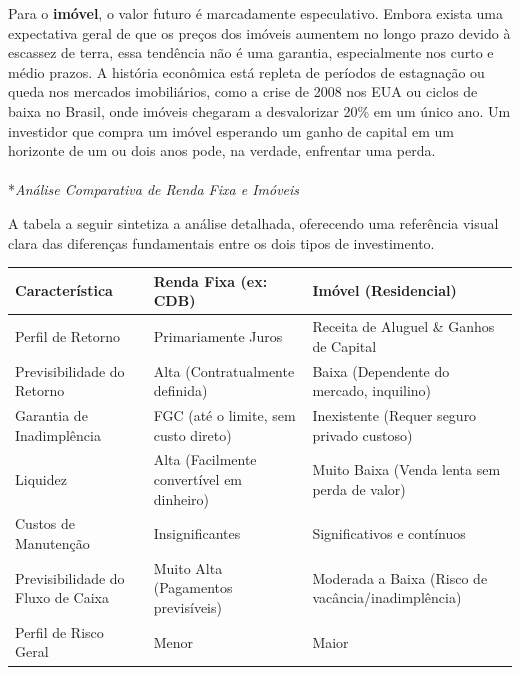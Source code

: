 \documentclass[
  a4paper,
]{book}
\makeatletter
\let\oldparagraph\paragraph
\renewcommand{\paragraph}{
    \@ifstar
      \xxxParagraphStar
      \xxxParagraphNoStar
  }
\newcommand{\xxxParagraphStar}[1]{\oldparagraph*{#1}\mbox{}}
\newcommand{\xxxParagraphNoStar}[1]{\oldparagraph{#1}\mbox{}}
\makeatother
\begin{document}
Para o \textbf{imóvel}, o valor futuro é marcadamente especulativo.
Embora exista uma expectativa geral de que os preços dos imóveis
aumentem no longo prazo devido à escassez de terra, essa tendência não é
uma garantia, especialmente nos curto e médio prazos. A história
econômica está repleta de períodos de estagnação ou queda nos mercados
imobiliários, como a crise de 2008 nos EUA ou ciclos de baixa no Brasil,
onde imóveis chegaram a desvalorizar 20\% em um único ano. Um investidor
que compra um imóvel esperando um ganho de capital em um horizonte de um
ou dois anos pode, na verdade, enfrentar uma perda.

\paragraph*{\texorpdfstring{\emph{Análise Comparativa de Renda Fixa e
Imóveis}}{Análise Comparativa de Renda Fixa e Imóveis}}\label{anuxe1lise-comparativa-de-renda-fixa-e-imuxf3veis}

A tabela a seguir sintetiza a análise detalhada, oferecendo uma
referência visual clara das diferenças fundamentais entre os dois tipos
de investimento.

\begin{longtable}[]{@{}
  >{\raggedright\arraybackslash}p{}
  >{\raggedright\arraybackslash}p{}
  >{\raggedright\arraybackslash}p{}@{}}
\toprule\noalign{}
\begin{minipage}[b]{\linewidth}\raggedright
Característica
\end{minipage} & \begin{minipage}[b]{\linewidth}\raggedright
Renda Fixa (ex: CDB)
\end{minipage} & \begin{minipage}[b]{\linewidth}\raggedright
Imóvel (Residencial)
\end{minipage} \\
\midrule\noalign{}
\endhead
\bottomrule\noalign{}
\endlastfoot
Perfil de Retorno & Primariamente Juros & Receita de Aluguel \& Ganhos
de Capital \\
Previsibilidade do Retorno & Alta (Contratualmente definida) & Baixa
(Dependente do mercado, inquilino) \\
Garantia de Inadimplência & FGC (até o limite, sem custo direto) &
Inexistente (Requer seguro privado custoso) \\
Liquidez & Alta (Facilmente convertível em dinheiro) & Muito Baixa
(Venda lenta sem perda de valor) \\
Custos de Manutenção & Insignificantes & Significativos e contínuos \\
Previsibilidade do Fluxo de Caixa & Muito Alta (Pagamentos previsíveis)
& Moderada a Baixa (Risco de vacância/inadimplência) \\
Perfil de Risco Geral & Menor & Maior \\
\end{longtable}
\end{document}
